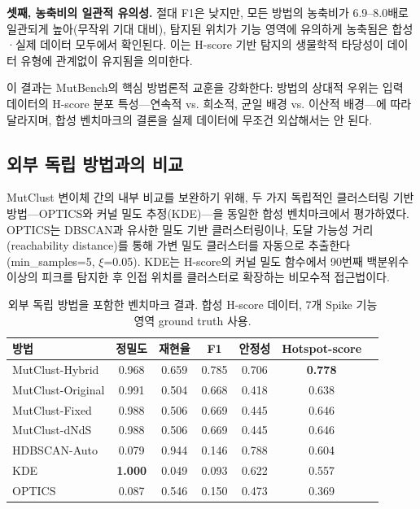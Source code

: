 \textbf{셋째, 농축비의 일관적 유의성.}
절대 F1은 낮지만, 모든 방법의 농축비가 6.9--8.0배로 일관되게 높아(무작위 기대 대비), 탐지된 위치가 기능 영역에 유의하게 농축됨은 합성·실제 데이터 모두에서 확인된다.
이는 H-score 기반 탐지의 생물학적 타당성이 데이터 유형에 관계없이 유지됨을 의미한다.

이 결과는 MutBench의 핵심 방법론적 교훈을 강화한다: 방법의 상대적 우위는 입력 데이터의 H-score 분포 특성---연속적 vs. 희소적, 균일 배경 vs. 이산적 배경---에 따라 달라지며, 합성 벤치마크의 결론을 실제 데이터에 무조건 외삽해서는 안 된다.


\subsection{외부 독립 방법과의 비교}
\label{sec:external_comparison}


MutClust 변이체 간의 내부 비교를 보완하기 위해, 두 가지 독립적인 클러스터링 기반 방법---OPTICS와 커널 밀도 추정(KDE)---을 동일한 합성 벤치마크에서 평가하였다.
OPTICS는 DBSCAN과 유사한 밀도 기반 클러스터링이나, 도달 가능성 거리(reachability distance)를 통해 가변 밀도 클러스터를 자동으로 추출한다(min\_samples=5, $\xi$=0.05).
KDE는 H-score의 커널 밀도 함수에서 90번째 백분위수 이상의 피크를 탐지한 후 인접 위치를 클러스터로 확장하는 비모수적 접근법이다.

\begin{table}[htbp]
\centering
\caption{외부 독립 방법을 포함한 벤치마크 결과. 합성 H-score 데이터, 7개 Spike 기능 영역 ground truth 사용.}
\label{tab:external_methods}
\small
\begin{tabular}{lcccccc}
\toprule
방법 & 정밀도 & 재현율 & F1 & 안정성 & Hotspot-score \\
\midrule
MutClust-Hybrid & 0.968 & 0.659 & 0.785 & 0.706 & \textbf{0.778} \\
MutClust-Original & 0.991 & 0.504 & 0.668 & 0.418 & 0.638 \\
MutClust-Fixed & 0.988 & 0.506 & 0.669 & 0.445 & 0.646 \\
MutClust-dNdS & 0.988 & 0.506 & 0.669 & 0.445 & 0.646 \\
HDBSCAN-Auto & 0.079 & 0.944 & 0.146 & 0.788 & 0.604 \\
KDE & \textbf{1.000} & 0.049 & 0.093 & 0.622 & 0.557 \\
OPTICS & 0.087 & 0.546 & 0.150 & 0.473 & 0.369 \\
\bottomrule
\end{tabular}
\end{table}

